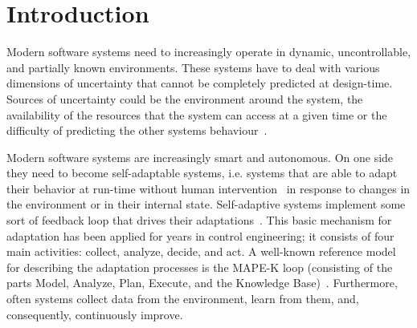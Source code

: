 \documentclass[sigconf,review, anonymous]{acmart}
\begin{document}
\begin{abstract}
...
\end{abstract}






\maketitle

%
%
%
%
%
%

\section{Introduction}



Modern software systems need to increasingly operate 
in dynamic, uncontrollable, and partially known environments. These systems have to deal with various dimensions of uncertainty that cannot be completely predicted at design-time.
Sources of uncertainty could be the environment around the system, the availability of the resources that the system can access at a given time or the difficulty of predicting the other systems behaviour~\cite{Esfahani2013,Autili2011,Garlan2010}. %

Modern software systems are increasingly smart and autonomous. On one side they need to become self-adaptable systems, i.e. systems that are able to adapt their behavior at run-time without human  intervention~\cite{survey,roadmap1,roadmap2} in response to changes in the environment or in their internal state. Self-adaptive systems implement some sort of feedback loop that drives their adaptations~\cite{brun2009engineering}. This basic mechanism for adaptation has been applied for years in control engineering; it consists of four main activities: collect, analyze, decide, and act. A well-known reference model for describing the adaptation processes is the MAPE-K loop (consisting of the parts Model, Analyze, Plan, Execute, and the Knowledge Base)~\cite{Kephart:2003hx}. Furthermore, often systems collect  data from the environment, learn from them, and, consequently, continuously improve. %
\end{document}
